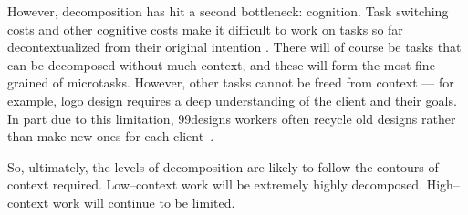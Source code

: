 \documentclass[trackingWork]{subfiles}
\begin{document}
However,
decomposition has hit a second bottleneck: cognition. 
Task switching costs and other cognitive costs make it difficult
to work on tasks so far decontextualized from their original intention \cite{delayAndOrderLasecki}.
There will of course be tasks that can be decomposed without much context,
and these will form the most fine--grained of microtasks.
However, other tasks cannot be freed from context
--- for example,
logo design requires a deep understanding of the client and their goals.
In part due to this limitation,
99designs workers often recycle old designs rather than make new ones for each client~\cite{araujo201399designs}.

So,
ultimately,
the levels of decomposition are likely to follow the contours of context required.
Low--context work will be extremely highly decomposed.
High--context work will continue to be limited.


\end{document}
